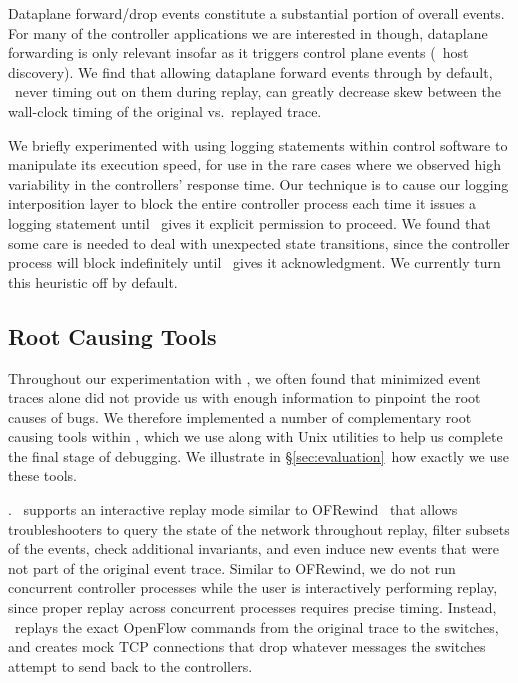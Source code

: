 
 Dataplane forward/drop events constitute a
substantial portion of overall events. For
many of the controller applications we are interested in though, dataplane
forwarding is only relevant insofar as it triggers control plane events
(\eg~host discovery). We find that allowing dataplane forward events through by
default, \ie~never timing out on them during replay, can greatly decrease
skew between the wall-clock timing of the original vs.\ replayed trace.

 We briefly experimented
with using logging statements within control software to manipulate its execution speed,
for use in the rare cases where we observed high variability in the
controllers' response time. Our technique is to cause our logging
interposition layer to block the entire controller
process each time it issues a logging statement until \projectname~gives it
explicit permission to proceed. We found that some care is needed to deal
with unexpected state transitions, since the controller process will block
indefinitely until \projectname~gives it acknowledgment.
We currently turn this heuristic off by default.

\subsection{Root Causing Tools}
\label{subsec:root_causing}

Throughout our experimentation with \projectname, we often found that
minimized event traces alone did not provide us with enough information to
pinpoint the root causes of bugs. We therefore implemented a number of
complementary root
causing tools within \projectname,
which we use along with Unix utilities to help us complete the final
stage of debugging. We illustrate in \S\ref{sec:evaluation}~how exactly we use
these tools.

. \projectname~supports an interactive replay mode
similar to OFRewind~\cite{ofrewind} that allows troubleshooters to query the
state of the network throughout replay, filter subsets of the events, check
additional invariants, and
even induce new events that were not part of the original event trace.
Similar to OFRewind, we do not run concurrent controller processes while the
user is interactively performing replay, since proper replay across
concurrent processes requires precise timing.
Instead, \projectname~replays the exact OpenFlow commands from the
original trace to the switches, and creates mock TCP connections that drop
whatever messages the switches attempt to send back to the controllers.

